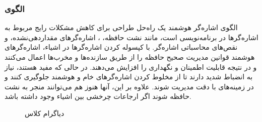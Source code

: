 \subsubsection{الگوی }
\label{memSmartPointerSec}
\begin{RTL}
الگوی اشاره‌گر هوشمند \cite{ref4}
یک راه‌حل طراحی برای کاهش مشکلات رایج مربوط به اشاره‌گرها
در برنامه‌نویسی است، مانند نشت حافظه،
، اشاره‌گرهای مقداردهی‌نشده،
و نقص‌های محاسباتی اشاره‌گر.
با کپسوله کردن اشاره‌گرها در اشیاء، اشاره‌گرهای هوشمند قوانین مدیریت
صحیح حافظه را از طریق سازنده‌ها و مخرب‌ها اعمال می‌کنند
و در نتیجه قابلیت اطمینان و نگهداری را افزایش می‌دهند.
در حالی که مفید هستند، نیاز به انضباط شدید دارند تا از مخلوط کردن
اشاره‌گرهای خام و هوشمند جلوگیری کنند و در زمینه‌های 
با دقت مدیریت شوند.
علاوه بر این، آنها هنوز هم می‌توانند منجر به نشت حافظه شوند اگر ارجاعات
چرخشی بین اشیاء وجود داشته باشد.
\end{RTL}
\begin{figure}[h!]
\centering
{}
\caption{دیاگرام کلاس }
\label{memSmartPointerClassDiag}
\end{figure}